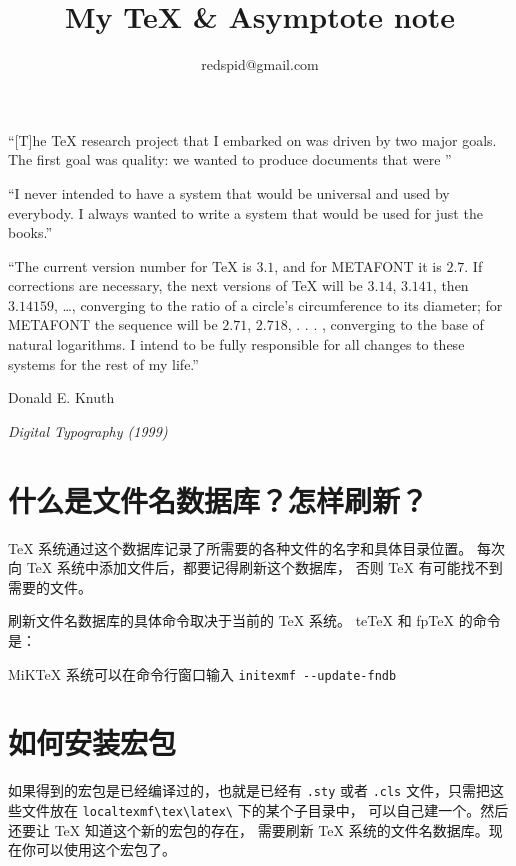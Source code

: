 \documentclass[a4paper,11pt]{article}
\begin{document}
\title{My \TeX{} \& Asymptote note}
\author{redspid@gmail.com}
\maketitle
\vspace{3cm}
\begin{center}
\begin{minipage}[t]{13cm}
{\Large ``[T]he \TeX{} research project that I embarked on was driven
by two major goals. The first goal was quality: we wanted to
produce documents that were
''

``I never intended to have a system that would be universal and
used by everybody. I always wanted to write a system
that would be used for just the  books.''

``The current version number for \TeX{} is $3.1$, and for METAFONT
it is $2.7$. If corrections are necessary, the next versions
of \TeX{} will be $3.14$, $3.141$, then $3.14159$, \ldots ,
converging to the ratio of a circle's circumference to its diameter;
for METAFONT the sequence will be $2.71$, $2.718$, . . . ,
converging to the base of natural logarithms. I intend to be fully
responsible for all changes to these systems for the rest of my life.''

\hfill Donald E. Knuth

\hfill {\it Digital Typography (1999)}}
\end{minipage}
\end{center}

\newpage
\tableofcontents
\listoffigures

\newpage
\section{什么是文件名数据库？怎样刷新？}
\TeX{} 系统通过这个数据库记录了所需要的各种文件的名字和具体目录位置。
每次向 \TeX{} 系统中添加文件后，都要记得刷新这个数据库，
否则 \TeX{} 有可能找不到需要的文件。

刷新文件名数据库的具体命令取决于当前的 \TeX{} 系统。
te\TeX{} 和 fp\TeX{} 的命令是：

MiK\TeX{} 系统可以在命令行窗口输入 \verb+initexmf --update-fndb+

\section{如何安装宏包}
如果得到的宏包是已经编译过的，也就是已经有 \verb+.sty+ 或者 \verb+.cls+
文件，只需把这些文件放在 \verb+localtexmf\tex\latex\+ 下的某个子目录中，
可以自己建一个。然后还要让 \TeX{} 知道这个新的宏包的存在，
需要刷新 \TeX{} 系统的文件名数据库。现在你可以使用这个宏包了。
\end{document}
